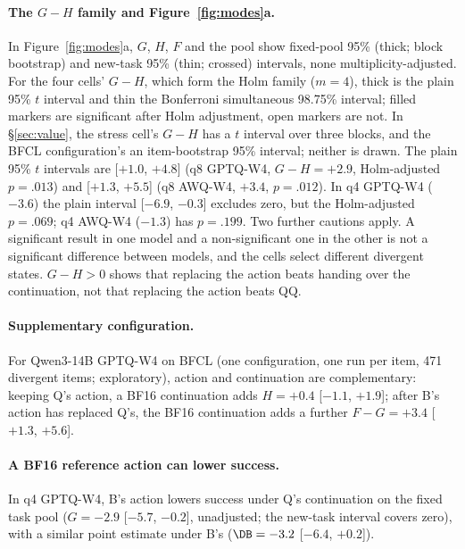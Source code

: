 \paragraph{The $G-H$ family and Figure~\ref{fig:modes}a.} In Figure~\ref{fig:modes}a, $G$, $H$, $F$ and the pool show fixed-pool 95\% (thick; block bootstrap) and new-task 95\% (thin; crossed) intervals, none multiplicity-adjusted. For the four cells' $G-H$, which form the Holm family ($m=4$), thick is the plain 95\% $t$ interval and thin the Bonferroni simultaneous 98.75\% interval; filled markers are significant after Holm adjustment, open markers are not. In \S\ref{sec:value}, the stress cell's $G-H$ has a $t$ interval over three blocks, and the BFCL configuration's an item-bootstrap 95\% interval; neither is drawn. %
The plain 95\% $t$ intervals are [$+1.0$, $+4.8$] (q8 GPTQ-W4, $G-H=+2.9$, Holm-adjusted $p=.013$) and [$+1.3$, $+5.5$] (q8 AWQ-W4, $+3.4$, $p=.012$). In q4 GPTQ-W4 ($-3.6$) the plain interval [$-6.9$, $-0.3$] excludes zero, but the Holm-adjusted $p=.069$; q4 AWQ-W4 ($-1.3$) has $p=.199$. Two further cautions apply. A significant result in one model and a non-significant one in the other is not a significant difference between models, and the cells select different divergent states. $G-H>0$ shows that replacing the action beats handing over the continuation, not that replacing the action beats QQ. %

\paragraph{Supplementary configuration.} For Qwen3-14B GPTQ-W4 on BFCL (one configuration, one run per item, 471 divergent items; exploratory), action and continuation are complementary: keeping Q's action, a BF16 continuation adds $H=+0.4$ [$-1.1$, $+1.9$]\pp{}; after B's action has replaced Q's, the BF16 continuation adds a further $F-G=+3.4$ [$+1.3$, $+5.6$]\pp{}. %

\paragraph{A BF16 reference action can lower success.} In q4 GPTQ-W4, B's action lowers success under Q's continuation on the fixed task pool ($G=-2.9$ [$-5.7$, $-0.2$]\pp{}, unadjusted; the new-task interval covers zero), with a similar point estimate under B's ($\DB=-3.2$ [$-6.4$, $+0.2$]). %


